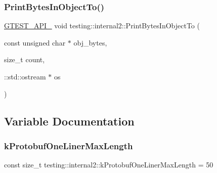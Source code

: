 \subsubsection{\texorpdfstring{PrintBytesInObjectTo()}{PrintBytesInObjectTo()}\hspace{0.1cm}{\footnotesize\ttfamily [2/2]}}
{\footnotesize\ttfamily \mbox{\hyperlink{_obj__test_2lib_2googletest-release-1_88_81_2googletest_2include_2gtest_2internal_2gtest-port_8h_aa73be6f0ba4a7456180a94904ce17790}{G\+T\+E\+S\+T\+\_\+\+A\+P\+I\+\_\+}} void testing\+::internal2\+::\+Print\+Bytes\+In\+Object\+To (\begin{DoxyParamCaption}\item[{const unsigned char $\ast$}]{obj\+\_\+bytes,  }\item[{size\+\_\+t}]{count,  }\item[{\+::std\+::ostream $\ast$}]{os }\end{DoxyParamCaption})}



\subsection{Variable Documentation}
\mbox{\label{namespacetesting_1_1internal2_a140c8efd51e63a3def98445bff107518}} 
\subsubsection{\texorpdfstring{kProtobufOneLinerMaxLength}{kProtobufOneLinerMaxLength}}
{\footnotesize\ttfamily const size\+\_\+t testing\+::internal2\+::k\+Protobuf\+One\+Liner\+Max\+Length = 50}

